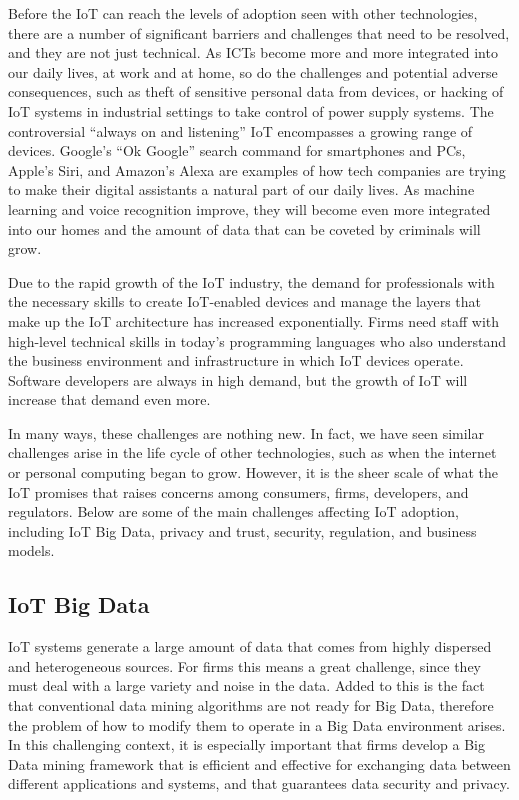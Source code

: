 \documentclass[
  letterpaper,
  DIV=11,
  numbers=noendperiod]{scrreprt}
\begin{document}
Before the IoT can reach the levels of adoption seen with other
technologies, there are a number of significant barriers and challenges
that need to be resolved, and they are not just technical. As ICTs
become more and more integrated into our daily lives, at work and at
home, so do the challenges and potential adverse consequences, such as
theft of sensitive personal data from devices, or hacking of IoT systems
in industrial settings to take control of power supply systems. The
controversial ``always on and listening'' IoT encompasses a growing
range of devices. Google's ``Ok Google'' search command for smartphones
and PCs, Apple's Siri, and Amazon's Alexa are examples of how tech
companies are trying to make their digital assistants a natural part of
our daily lives. As machine learning and voice recognition improve, they
will become even more integrated into our homes and the amount of data
that can be coveted by criminals will grow.

Due to the rapid growth of the IoT industry, the demand for
professionals with the necessary skills to create IoT-enabled devices
and manage the layers that make up the IoT architecture has increased
exponentially. Firms need staff with high-level technical skills in
today's programming languages who also understand the business
environment and infrastructure in which IoT devices operate. Software
developers are always in high demand, but the growth of IoT will
increase that demand even more.

In many ways, these challenges are nothing new. In fact, we have seen
similar challenges arise in the life cycle of other technologies, such
as when the internet or personal computing began to grow. However, it is
the sheer scale of what the IoT promises that raises concerns among
consumers, firms, developers, and regulators. Below are some of the main
challenges affecting IoT adoption, including IoT Big Data, privacy and
trust, security, regulation, and business models.

\hypertarget{iot-big-data}{%
\subsection{IoT Big Data}\label{iot-big-data}}

IoT systems generate a large amount of data that comes from highly
dispersed and heterogeneous sources. For firms this means a great
challenge, since they must deal with a large variety and noise in the
data. Added to this is the fact that conventional data mining algorithms
are not ready for Big Data, therefore the problem of how to modify them
to operate in a Big Data environment arises. In this challenging
context, it is especially important that firms develop a Big Data mining
framework that is efficient and effective for exchanging data between
different applications and systems, and that guarantees data security
and privacy.
\end{document}
